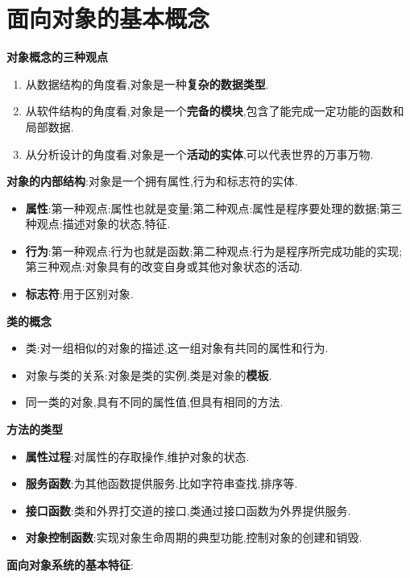 \documentclass[../main.tex]{subfiles}
\begin{document}
\section{面向对象的基本概念}
\textbf{对象概念的三种观点}
\begin{enumerate}
  \item 从数据结构的角度看,对象是一种\textbf{复杂的数据类型}.
  \item 从软件结构的角度看,对象是一个\textbf{完备的模块},包含了能完成一定功能的函数和局部数据.
  \item 从分析设计的角度看,对象是一个\textbf{活动的实体},可以代表世界的万事万物.
\end{enumerate}
\textbf{对象的内部结构}:对象是一个拥有属性,行为和标志符的实体.
\begin{itemize}
  \item \textbf{属性}:第一种观点:属性也就是变量;第二种观点:属性是程序要处理的数据;第三种观点:描述对象的状态,特征.
  \item \textbf{行为}:第一种观点:行为也就是函数;第二种观点:行为是程序所完成功能的实现;第三种观点:对象具有的改变自身或其他对象状态的活动.
  \item \textbf{标志符}:用于区别对象.
\end{itemize}
\textbf{类的概念}
\begin{itemize}
  \item 类:对一组相似的对象的描述,这一组对象有共同的属性和行为.
  \item 对象与类的关系:对象是类的实例,类是对象的\textbf{模板}.
  \item 同一类的对象,具有不同的属性值,但具有相同的方法.
\end{itemize}
\textbf{方法的类型}
\begin{itemize}
  \item \textbf{属性过程}:对属性的存取操作,维护对象的状态.
  \item \textbf{服务函数}:为其他函数提供服务.比如字符串查找,排序等.
  \item \textbf{接口函数}:类和外界打交道的接口,类通过接口函数为外界提供服务.
  \item \textbf{对象控制函数}:实现对象生命周期的典型功能,控制对象的创建和销毁.
\end{itemize}
\textbf{面向对象系统的基本特征}:
\end{document}
